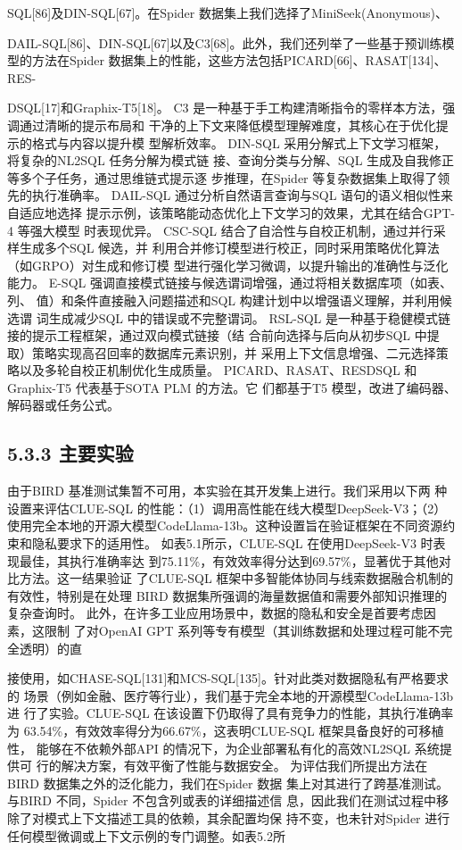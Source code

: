 \documentclass[12pt,a4paper,openright,UTF8]{ctexbook}
\begin{document}
SQL[86]及DIN-SQL[67]。在Spider 数据集上我们选择了MiniSeek(Anonymous)、

DAIL-SQL[86]、DIN-SQL[67]以及C3[68]。此外，我们还列举了一些基于预训练模 型的方法在Spider 数据集上的性能，这些方法包括PICARD[66]、RASAT[134]、RES-

DSQL[17]和Graphix-T5[18]。 C3 是一种基于手工构建清晰指令的零样本方法，强调通过清晰的提示布局和 干净的上下文来降低模型理解难度，其核心在于优化提示的格式与内容以提升模 型解析效率。 DIN-SQL 采用分解式上下文学习框架，将复杂的NL2SQL 任务分解为模式链 接、查询分类与分解、SQL 生成及自我修正等多个子任务，通过思维链式提示逐 步推理，在Spider 等复杂数据集上取得了领先的执行准确率。 DAIL-SQL 通过分析自然语言查询与SQL 语句的语义相似性来自适应地选择 提示示例，该策略能动态优化上下文学习的效果，尤其在结合GPT-4 等强大模型 时表现优异。 CSC-SQL 结合了自洽性与自校正机制，通过并行采样生成多个SQL 候选，并 利用合并修订模型进行校正，同时采用策略优化算法（如GRPO）对生成和修订模 型进行强化学习微调，以提升输出的准确性与泛化能力。 E-SQL 强调直接模式链接与候选谓词增强，通过将相关数据库项（如表、列、 值）和条件直接融入问题描述和SQL 构建计划中以增强语义理解，并利用候选谓 词生成减少SQL 中的错误或不完整谓词。 RSL-SQL 是一种基于稳健模式链接的提示工程框架，通过双向模式链接（结 合前向选择与后向从初步SQL 中提取）策略实现高召回率的数据库元素识别，并 采用上下文信息增强、二元选择策略以及多轮自校正机制优化生成质量。 PICARD、RASAT、RESDSQL 和Graphix-T5 代表基于SOTA PLM 的方法。它 们都基于T5 模型，改进了编码器、解码器或任务公式。

\subsection{5.3.3 主要实验}

由于BIRD 基准测试集暂不可用，本实验在其开发集上进行。我们采用以下两 种设置来评估CLUE-SQL 的性能：（1）调用高性能在线大模型DeepSeek-V3；（2） 使用完全本地的开源大模型CodeLlama-13b。这种设置旨在验证框架在不同资源约 束和隐私要求下的适用性。 如表5.1所示，CLUE-SQL 在使用DeepSeek-V3 时表现最佳，其执行准确率达 到75.11\%，有效效率得分达到69.57\%，显著优于其他对比方法。这一结果验证 了CLUE-SQL 框架中多智能体协同与线索数据融合机制的有效性，特别是在处理 BIRD 数据集所强调的海量数据值和需要外部知识推理的复杂查询时。 此外，在许多工业应用场景中，数据的隐私和安全是首要考虑因素，这限制 了对OpenAI GPT 系列等专有模型（其训练数据和处理过程可能不完全透明）的直

接使用，如CHASE-SQL[131]和MCS-SQL[135]。针对此类对数据隐私有严格要求的 场景（例如金融、医疗等行业），我们基于完全本地的开源模型CodeLlama-13b 进 行了实验。CLUE-SQL 在该设置下仍取得了具有竞争力的性能，其执行准确率为 63.54\%，有效效率得分为66.67\%，这表明CLUE-SQL 框架具备良好的可移植性， 能够在不依赖外部API 的情况下，为企业部署私有化的高效NL2SQL 系统提供可 行的解决方案，有效平衡了性能与数据安全。 为评估我们所提出方法在BIRD 数据集之外的泛化能力，我们在Spider 数据 集上对其进行了跨基准测试。与BIRD 不同，Spider 不包含列或表的详细描述信 息，因此我们在测试过程中移除了对模式上下文描述工具的依赖，其余配置均保 持不变，也未针对Spider 进行任何模型微调或上下文示例的专门调整。如表5.2所
\end{document}
